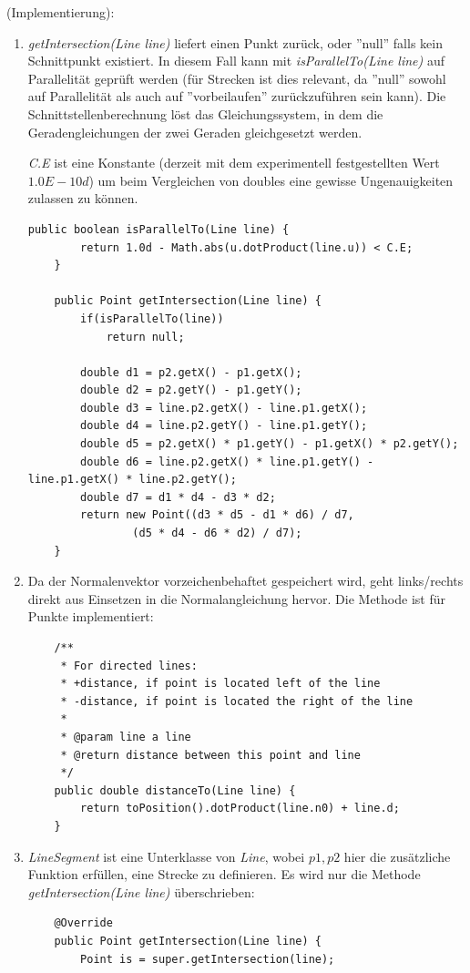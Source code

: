\documentclass[a4paper, titlepage=false, parskip=full-, 10pt]{scrartcl}
\newcounter{tasknbr}
\newenvironment{task}[1]{{\bf Aufgabe \arabic {tasknbr}\stepcounter{tasknbr}} (#1):\begin{enumerate}}{\end{enumerate}}
\newcommand{\subtask}[1]{\item[#1)]}
\begin{document}
\begin{task}{Implementierung}
\subtask{b}
\emph{getIntersection(Line line)} liefert einen Punkt zurück, oder ''null'' falls kein Schnittpunkt existiert. In diesem Fall kann mit \emph{isParallelTo(Line line)} auf Parallelität geprüft werden (für Strecken ist dies relevant, da ''null'' sowohl auf Parallelität als auch auf ''vorbeilaufen'' zurückzuführen sein kann). Die Schnittstellenberechnung löst das Gleichungssystem, in dem die Geradengleichungen der zwei Geraden gleichgesetzt werden.

\emph{C.E} ist eine Konstante (derzeit mit dem experimentell festgestellten Wert $1.0E-10d$) um beim Vergleichen von doubles eine gewisse Ungenauigkeiten zulassen zu können.
\begin{lstlisting}
public boolean isParallelTo(Line line) {
        return 1.0d - Math.abs(u.dotProduct(line.u)) < C.E;
    }

    public Point getIntersection(Line line) {
        if(isParallelTo(line))
            return null;

        double d1 = p2.getX() - p1.getX();
        double d2 = p2.getY() - p1.getY();
        double d3 = line.p2.getX() - line.p1.getX();
        double d4 = line.p2.getY() - line.p1.getY();
        double d5 = p2.getX() * p1.getY() - p1.getX() * p2.getY();
        double d6 = line.p2.getX() * line.p1.getY() - line.p1.getX() * line.p2.getY();
        double d7 = d1 * d4 - d3 * d2;
        return new Point((d3 * d5 - d1 * d6) / d7,
                (d5 * d4 - d6 * d2) / d7);
    }
\end{lstlisting}

\subtask{c}
Da der Normalenvektor vorzeichenbehaftet gespeichert wird, geht links/rechts direkt aus Einsetzen in die Normalangleichung hervor. Die Methode ist für Punkte implementiert:
\begin{lstlisting}
    /**
     * For directed lines:
     * +distance, if point is located left of the line
     * -distance, if point is located the right of the line
     * 
     * @param line a line
     * @return distance between this point and line
     */
    public double distanceTo(Line line) {
        return toPosition().dotProduct(line.n0) + line.d;
    }
\end{lstlisting}

\subtask{d}
\emph{LineSegment} ist eine Unterklasse von \emph{Line}, wobei $p1, p2$ hier die zusätzliche Funktion erfüllen, eine Strecke zu definieren. Es wird nur die Methode \emph{getIntersection(Line line)} überschrieben:
\begin{lstlisting}
    @Override
    public Point getIntersection(Line line) {
        Point is = super.getIntersection(line);


\end{lstlisting}
\end{task}
\end{document}
